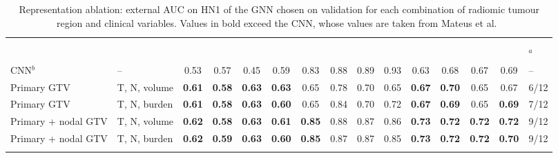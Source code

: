 \begin{table}[!tp]
\centering
\caption{Representation ablation: external AUC on HN1 of the GNN chosen on validation for each combination of radiomic tumour region and clinical variables. Values in bold exceed the CNN, whose values are taken from Mateus et al.~\cite{mateus2023}}\label{tab:ablation}
\tabsetup\setlength{\tabcolsep}{2.6pt}
\begin{tabularx}{\textwidth}{Q{3.0cm} Q{1.9cm} *{12}{C} P{1.0cm}}
\toprule
 & &  &  &  & \\
\cmidrule(lr){3-6}\cmidrule(lr){7-10}\cmidrule(lr){11-14}
 & &  &  &  &  &  &  & \\
\cmidrule(lr){3-4}\cmidrule(lr){5-6}\cmidrule(lr){7-8}\cmidrule(lr){9-10}\cmidrule(lr){11-12}\cmidrule(lr){13-14}
 &  &  &  &  &  &  &  &  &  &  &  &  &  & $^{a}$ \\
\midrule
{}CNN$^{b}$ & -- & 0.53 & 0.57 & 0.45 & 0.59 & 0.83 & 0.88 & 0.89 & 0.93 & 0.63 & 0.68 & 0.67 & 0.69 & -- \\
Primary GTV & T, N, volume & \textbf{0.61} & \textbf{0.58} & \textbf{0.63} & \textbf{0.63} & 0.65 & 0.78 & 0.70 & 0.65 & \textbf{0.67} & \textbf{0.70} & 0.65 & 0.67 & 6/12 \\
Primary GTV & T, N, burden & \textbf{0.61} & \textbf{0.58} & \textbf{0.63} & \textbf{0.60} & 0.65 & 0.84 & 0.70 & 0.72 & \textbf{0.67} & \textbf{0.69} & 0.65 & \textbf{0.69} & 7/12 \\
Primary + nodal GTV & T, N, volume & \textbf{0.62} & \textbf{0.58} & \textbf{0.63} & \textbf{0.61} & \textbf{0.85} & 0.88 & 0.87 & 0.86 & \textbf{0.73} & \textbf{0.72} & \textbf{0.72} & \textbf{0.72} & 9/12 \\
Primary + nodal GTV & T, N, burden & \textbf{0.62} & \textbf{0.59} & \textbf{0.63} & \textbf{0.60} & \textbf{0.85} & 0.87 & 0.87 & 0.85 & \textbf{0.73} & \textbf{0.72} & \textbf{0.72} & \textbf{0.70} & 9/12 \\
\botrule
\end{tabularx}
\end{table}
